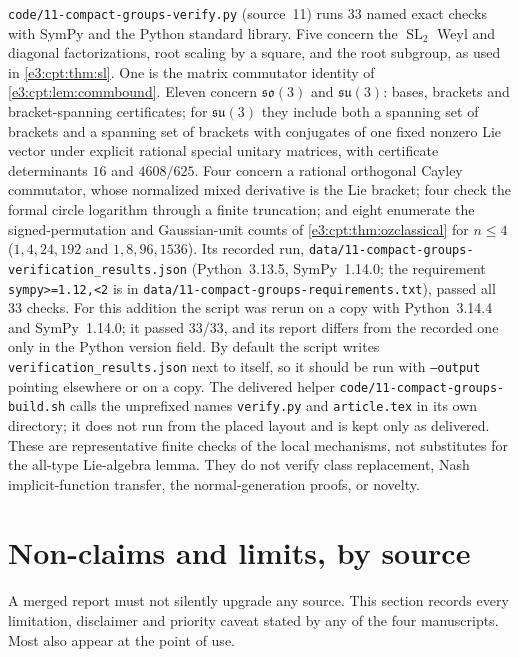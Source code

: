 \documentclass[11pt,letterpaper]{article}
\numberwithin{equation}{section}
\theoremstyle{definition}
\theoremstyle{remark}
\newcommand{\so}{\mathfrak{so}}
\newcommand{\SL}{\operatorname{SL}}
\begin{document}
\texttt{code/11-compact-groups-verify.py} (source~11) runs 33 named exact checks
with SymPy and the Python standard library. Five concern the $\SL_2$ Weyl and
diagonal factorizations, root scaling by a square, and the root subgroup, as
used in \cref{e3:cpt:thm:sl}. One is the matrix commutator identity of
\cref{e3:cpt:lem:commbound}. Eleven concern $\so(3)$ and $\mathfrak{su}(3)$:
bases, brackets and bracket-spanning certificates; for $\mathfrak{su}(3)$ they
include both a
spanning set of brackets and a spanning set of brackets with conjugates of one
fixed nonzero Lie vector under explicit rational special unitary matrices, with
certificate determinants $16$ and $4608/625$. Four concern a rational orthogonal
Cayley commutator, whose normalized mixed derivative is the Lie bracket; four
check the formal circle logarithm through a finite truncation; and eight
enumerate the signed-permutation and Gaussian-unit counts of
\cref{e3:cpt:thm:ozclassical} for $n\le4$ ($1,4,24,192$ and $1,8,96,1536$). Its
recorded run, \texttt{data/11-compact-groups-verification\_results.json}
(Python~3.13.5, SymPy~1.14.0; the requirement \texttt{sympy>=1.12,<2} is in
\texttt{data/11-compact-groups-requirements.txt}), passed all 33 checks. For
this addition the script was rerun on a copy with Python~3.14.4 and
SymPy~1.14.0; it passed 33/33, and its report differs from the recorded one only
in the Python version field. By default the script writes
\texttt{verification\_results.json} next to itself, so it should be run with
\texttt{--output} pointing elsewhere or on a copy. The delivered helper
\texttt{code/11-compact-groups-build.sh} calls the unprefixed names
\texttt{verify.py} and \texttt{article.tex} in its own directory; it does not run
from the placed layout and is kept only as delivered. These are representative
finite checks of the local mechanisms, not substitutes for the all-type
Lie-algebra lemma. They do not verify class replacement, Nash implicit-function
transfer, the normal-generation proofs, or novelty.

\section{Non-claims and limits, by source}\label{e3:sec:nonclaims}

A merged report must not silently upgrade any source. This section records
every limitation, disclaimer and priority caveat stated by any of the four
manuscripts.
Most also appear at the point of use.
\end{document}
